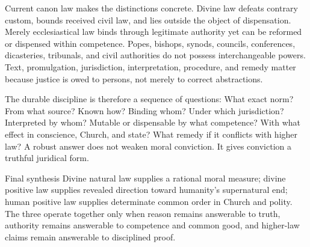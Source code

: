 Current canon law makes the distinctions concrete. Divine law defeats contrary custom, bounds received civil law, and lies outside the object of dispensation. Merely ecclesiastical law binds through legitimate authority yet can be reformed or dispensed within competence. Popes, bishops, synods, councils, conferences, dicasteries, tribunals, and civil authorities do not possess interchangeable powers. Text, promulgation, jurisdiction, interpretation, procedure, and remedy matter because justice is owed to persons, not merely to correct abstractions.

The durable discipline is therefore a sequence of questions: What exact norm? From what source? Known how? Binding whom? Under which jurisdiction? Interpreted by whom? Mutable or dispensable by what competence? With what effect in conscience, Church, and state? What remedy if it conflicts with higher law? A robust answer does not weaken moral conviction. It gives conviction a truthful juridical form.

\begin{studybox}{Final synthesis}
Divine natural law supplies a rational moral measure; divine positive law supplies revealed direction toward humanity's supernatural end; human positive law supplies determinate common order in Church and polity. The three operate together only when reason remains answerable to truth, authority remains answerable to competence and common good, and higher-law claims remain answerable to disciplined proof.
\end{studybox}
